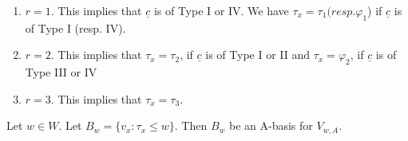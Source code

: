 \begin{enumerate}[(1)]
\item $r=1$. This implies that $ \underline{c}$ is of Type I or IV. We have $\tau_{x}= \tau_{1} (resp. \varphi_{1}$) if $\underline{c}$ is of Type I (resp. IV).

\item $r=2$. This implies that $ \tau_{x}= \tau_{2}$, if $\underline{c}$ is of Type I or II and $\tau_{x}= \varphi_{2}$, if $\underline{c}$ is of Type III or IV

\item $r=3$. This implies that $\tau_{x} = \tau_{3}$.
\end{enumerate}

\setcounter{theorem}{1}
\begin{theorem}\label{art9-thm-7.2}
Let $ w \in W$. Let $B_{w} = \{ v_{x} : \tau_{x}\leq w\}$. Then $B_{w}$ be an A-basis for $V_{w,A}$.
\end{theorem}

